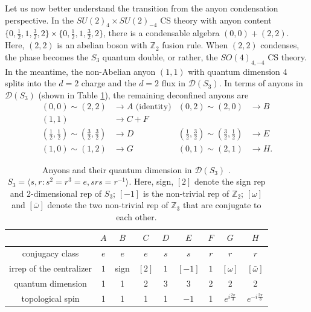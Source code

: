 \documentclass[aps, prl, superscriptaddress, twocolumn,
notitlepage, longbibliography,
floatfix]{revtex4-2}
\newcommand{\1}{\text{\uppercase\expandafter{\romannumeral1}}}
\newcommand{\2}{\text{\uppercase\expandafter{\romannumeral2}}}
\newcommand{\3}{\text{\uppercase\expandafter{\romannumeral3}}}
\newcommand{\4}{\text{\uppercase\expandafter{\romannumeral4}}}
\newcommand{\5}{\text{\uppercase\expandafter{\romannumeral5}}}
\newcommand{\6}{\text{\uppercase\expandafter{\romannumeral6}}}
\begin{document}
Let us now better understand the transition from the anyon condensation perspective. In the $SU(2)_4\times SU(2)_{-4}$ CS theory with anyon content $\{0,\frac{1}{2},1,\frac{3}{2},2\}\times \{0,\frac{1}{2},1,\frac{3}{2},2\}$, there is a condensable algebra $(0,0) + (2,2)$. Here, $(2,2)$ is an abelian boson with $\mathbb{Z}_2$ fusion rule. When $(2,2)$ condenses, the phase becomes the $S_3$ quantum double, or rather, the $SO(4)_{4,-4}$ CS theory. In the meantime, the non-Abelian anyon $(1,1)$ with quantum dimension $4$ splits into the $d=2$ charge and the $d=2$ flux in $\mathcal{D}(S_3)$. In terms of anyons in $\mathcal{D}(S_3)$ (shown in Table \ref{fig:S3_anyons}), the remaining deconfined anyons are
\begin{equation}
\begin{aligned}
(0,0)\sim (2,2) &\rightarrow A \text{ (identity)}&
(0,2)\sim (2,0) & \rightarrow B\\
(1,1) & \rightarrow C + F \\
\left(\tfrac{1}{2},\tfrac{1}{2}\right)\sim \left(\tfrac{3}{2},\tfrac{3}{2}\right) &\rightarrow D&
\left(\tfrac{1}{2},\tfrac{3}{2}\right)\sim \left(\tfrac{3}{2},\tfrac{1}{2}\right) &\rightarrow E\\
(1,0)\sim (1,2) & \rightarrow G&
(0,1)\sim (2,1) & \rightarrow H.
\end{aligned}
\end{equation}

\begin{table}
\centering
\renewcommand{\arraystretch}{1.2}
\begin{tabular}{| c | c c c | c c | c c c |}
\hline
 & $ A $ & $ B $ & $ C $ & $ D $ & $ E $ & $ F $ & $ G $ & $ H $ \\
 \hline
conjugacy class & $e$ & $e$ & $e$ & $s$ & $s$ & $r$ &  $r$ & $r$ \\
irrep of the centralizer & $1$ & sign & $[2]$ & $1$ & $[-1]$ & $1$ & $[\omega]$ & $[\bar{\omega}]$ \\
\hline
quantum dimension & 1 & 1 & 2 & 3 & 3 & 2 & 2 & 2 \\
\hline
topological spin \rule{0pt}{3ex} & 1 & 1 & 1 & 1 & $-1$ & 1 & $e^{i\frac{2\pi}{3}}$ & $e^{-i\frac{2\pi}{3}}$ \\
\hline
\end{tabular}
\caption{Anyons and their quantum dimension in $\mathcal{D}(S_3)$  \cite{Kitaev:1997wr,beigi2011quantum}. $S_3=\langle s,r: s^2=r^3=e,srs = r^{-1}\rangle$. Here, sign, $[2]$ denote the sign rep and 2-dimensional rep of $S_3$; $[-1]$ is the non-trivial rep of $\mathbb{Z}_2$; $[\omega]$ and $[\bar{\omega}]$ denote the two non-trivial rep of $\mathbb{Z}_3$ that are conjugate to each other.}
\label{fig:S3_anyons}
\end{table}
\end{document}
